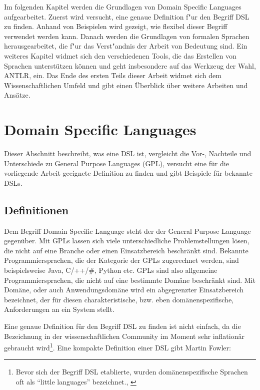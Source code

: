 Im folgenden Kapitel werden die Grundlagen von Domain Specific Languages aufgearbeitet. 
Zuerst wird versucht, eine genaue Definition f"ur den Begriff DSL zu finden. 
Anhand von Beispielen wird gezeigt, wie flexibel dieser Begriff verwendet werden kann. 
Danach werden die Grundlagen von formalen Sprachen herausgearbeitet, die f"ur das Verst"andnis der Arbeit von Bedeutung sind. 
Ein weiteres Kapitel widmet sich den verschiedenen Tools, die das Erstellen von Sprachen unterstützen können und geht insbesondere auf das Werkzeug der Wahl, ANTLR, ein.
Das Ende des ersten Teils dieser Arbeit widmet sich dem Wissenschaftlichen Umfeld und gibt einen Überblick über weitere Arbeiten und Ansätze.



\newpage

\chapter{Domain Specific Languages}
\label{chapter_dsl}

Dieser Abschnitt beschreibt, was eine DSL ist, vergleicht die Vor-, Nachteile und Unterschiede zu General Purpose Languages (GPL), versucht eine für die vorliegende Arbeit geeignete Definition zu finden und gibt Beispiele für bekannte DSLs.

\section{Definitionen}

Dem Begriff Domain Specific Language steht der der General Purpose Language gegenüber. Mit GPLs lassen sich viele unterschiedliche Problemstellungen lösen, die nicht auf eine Branche oder einen Einsatzbereich beschränkt sind. Bekannte Programmiersprachen, die der Kategorie der GPLs zugerechnet werden, sind beispielsweise Java, C/++/\#, Python etc. GPLs sind also allgemeine Programmiersprachen, die nicht auf eine bestimmte Domäne beschränkt sind. Mit Domäne, oder auch Anwendungsdomäne wird ein abgegrenzter Einsatzbereich bezeichnet, der für diesen charakteristische, bzw. eben domänenspezifische, Anforderungen an ein System stellt.

Eine genaue Definition für den Begriff DSL zu finden ist nicht einfach, da die Bezeichnung in der wissenschaftlichen Community im Moment sehr inflationär gebraucht wird\footnote{Bevor sich der Begriff DSL etablierte, wurden domänenspezifische Sprachen oft als ``little languages'' bezeichnet., \cite{VaDe00}}. Eine kompakte Definition einer DSL gibt Martin Fowler:

